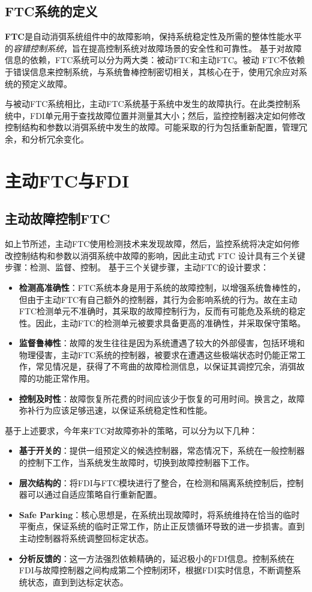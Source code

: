 \documentclass[UTF8]{article}
\begin{document}
\subsection{FTC系统的定义}
\textbf{FTC}是自动消弭系统组件中的故障影响，保持系统稳定性及所需的整体性能水平的\emph{容错控制系统}，旨在提⾼控制系统对故障场景的安全性和可靠性。
基于对故障信息的依赖，FTC系统可以分为两⼤类：被动FTC和主动FTC。被动 FTC不依赖于错误信息来控制系统，与系统鲁棒控制密切相关，其核心在于，使用冗余应对系统的预定义故障。

与被动FTC系统相⽐，主动FTC系统基于系统中发⽣的故障执⾏。在此类控制系统中，FDI单元⽤于查找故障位置并测量其⼤⼩；然后，监控控制器决定如何修改控制结构和参数以消弭系统中发⽣的故障。可能采取的行为包括重新配置，管理冗余，和分析冗余变化。

\section{主动FTC与FDI}
\subsection{主动故障控制FTC}
如上节所述，主动FTC使⽤检测技术来发现故障，然后，监控系统将决定如何修改控制结构和参数以消弭系统中故障的影响，因此主动式 FTC 设计具有三个关键步骤：检测、监督、控制。
基于三个关键步骤，主动FTC的设计要求：
\begin{itemize}
  \item \textbf{检测高准确性}：FTC系统本身是用于系统的故障控制，以增强系统鲁棒性的，但由于主动FTC有自己额外的控制器，其行为会影响系统的行为。故在主动FTC检测单元不准确时，其采取的故障控制行为，反而有可能危及系统的稳定性。因此，主动FTC的检测单元被要求具备更高的准确性，并采取保守策略。
  \item \textbf{监督鲁棒性}：故障的发生往往是因为系统遭遇了较大的外部侵害，包括环境和物理侵害，主动FTC系统的控制器，被要求在遭遇这些极端状态时仍能正常工作，常见情况是，获得了不弯曲的故障检测信息，以保证其调控冗余，消弭故障的功能正常作用。
  \item \textbf{控制及时性}：故障恢复所花费的时间应该少于恢复的可⽤时间。换⾔之，故障弥补行为应该⾜够迅速，以保证系统稳定性和性能。
\end{itemize}
基于上述要求，今年来FTC对故障弥补的策略，可以分为以下几种：
\begin{itemize}
  \item \textbf{基于开关的}\cite{LingliLu2011SupervisoryFT}：提供一组预定义的候选控制器，常态情况下，系统在一般控制器的控制下工作，当系统发生故障时，切换到故障控制器下工作。
  \item \textbf{层次结构的}：将FDI与FTC模块进行了整合，在检测和隔离系统控制后，控制器可以通过自适应策略\cite{XiaodongZhang2010AdaptiveFD}自行重新配置。
  \item \textbf{Safe Parking}\cite{RahulGandhi2009ASF}：核心思想是，在系统出现故障时，将系统维持在恰当的临时平衡点，保证系统的临时正常工作，防止正反馈循环导致的进一步损害。直到主动控制器将系统调整回标定状态。
  \item \textbf{分析反馈的}\cite{AlirezaAbbaspour2019AnAR}：这一方法强烈依赖精确的，延迟极小的FDI信息。控制系统在FDI与故障控制器之间构成第二个控制闭环，根据FDI实时信息，不断调整系统状态，直到到达标定状态。
\end{itemize}
\end{document}
